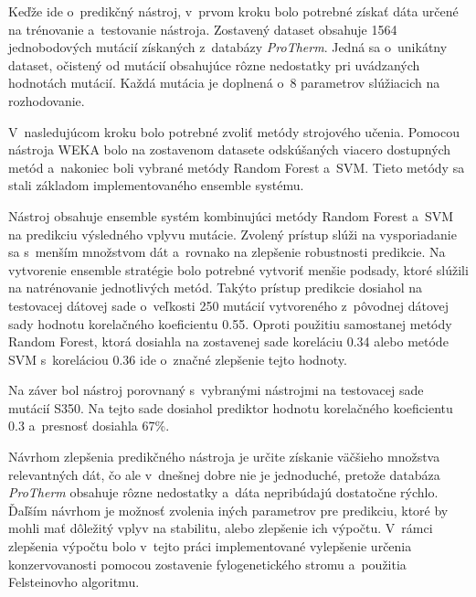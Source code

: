 Keďže ide o~predikčný nástroj, v~prvom kroku bolo potrebné získať dáta určené na trénovanie a~testovanie nástroja. Zostavený dataset obsahuje 1564 jednobodových mutácií získaných z~databázy \textit{ProTherm}. Jedná sa o~unikátny dataset, očistený od mutácií obsahujúce rôzne nedostatky pri uvádzaných hodnotách mutácií. Každá mutácia je doplnená o~8 parametrov slúžiacich na rozhodovanie.

V~nasledujúcom kroku bolo potrebné zvoliť metódy strojového učenia. Pomocou nástroja WEKA bolo na zostavenom datasete odskúšaných viacero dostupných metód a~nakoniec boli vybrané metódy Random Forest a~SVM. Tieto metódy sa stali základom implementovaného ensemble systému.

Nástroj obsahuje ensemble systém kombinujúci metódy Random Forest a~SVM na predikciu výsledného vplyvu mutácie. Zvolený prístup slúži na vysporiadanie sa s~menším množstvom dát a~rovnako na zlepšenie robustnosti predikcie. 
Na vytvorenie ensemble stratégie bolo potrebné vytvoriť menšie podsady, ktoré slúžili na natrénovanie jednotlivých metód. Takýto prístup predikcie dosiahol na testovacej dátovej sade o~veľkosti 250 mutácií vytvoreného z~pôvodnej dátovej sady hodnotu korelačného koeficientu 0.55. Oproti použitiu samostanej metódy Random Forest, ktorá dosiahla na zostavenej sade koreláciu 0.34 alebo metóde SVM s~koreláciou 0.36 ide o~značné zlepšenie tejto hodnoty.

Na záver bol nástroj porovnaný s~vybranými nástrojmi na testovacej sade mutácií S350. Na tejto sade dosiahol prediktor hodnotu korelačného koeficientu 0.3 a~presnosť dosiahla 67\%.

Návrhom zlepšenia predikčného nástroja je určite získanie väčšieho množstva relevantných dát, čo ale v~dnešnej dobre nie je jednoduché, pretože databáza \textit{ProTherm} obsahuje rôzne nedostatky a~dáta nepribúdajú dostatočne rýchlo. 
Ďaľším návrhom je možnosť zvolenia iných parametrov pre predikciu, ktoré by mohli mať dôležitý vplyv na stabilitu, alebo zlepšenie ich výpočtu. V~rámci zlepšenia výpočtu bolo v~tejto práci implementované vylepšenie určenia konzervovanosti pomocou zostavenie fylogenetického stromu a~použitia Felsteinovho algoritmu.

